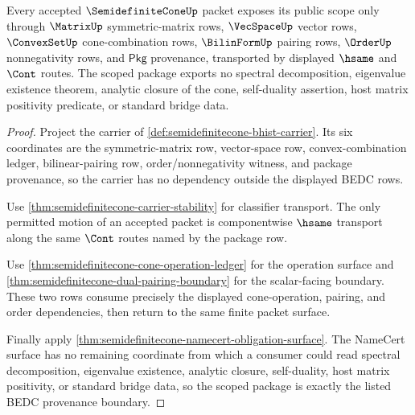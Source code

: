 \begin{theorem}
\label{thm:semidefinitecone-scoped-provenance-package}
Every accepted $\SemidefiniteConeUp$ packet exposes its public scope only
through $\MatrixUp$ symmetric-matrix rows, $\VecSpaceUp$ vector rows,
$\ConvexSetUp$ cone-combination rows, $\BilinFormUp$ pairing rows, $\OrderUp$
nonnegativity rows, and $\mathsf{Pkg}$ provenance, transported by displayed
$\hsame$ and $\Cont$ routes. The scoped package exports no spectral
decomposition, eigenvalue existence theorem, analytic closure of the cone,
self-duality assertion, host matrix positivity predicate, or standard bridge
data.
\end{theorem}
\begin{proof}
Project the carrier of \autoref{def:semidefinitecone-bhist-carrier}. Its six
coordinates are the symmetric-matrix row, vector-space row, convex-combination
ledger, bilinear-pairing row, order/nonnegativity witness, and package
provenance, so the carrier has no dependency outside the displayed BEDC rows.

Use \autoref{thm:semidefinitecone-carrier-stability} for classifier transport.
The only permitted motion of an accepted packet is componentwise $\hsame$
transport along the same $\Cont$ routes named by the package row.

Use \autoref{thm:semidefinitecone-cone-operation-ledger} for the operation
surface and \autoref{thm:semidefinitecone-dual-pairing-boundary} for the
scalar-facing boundary. These two rows consume precisely the displayed
cone-operation, pairing, and order dependencies, then return to the same finite
packet surface.

Finally apply \autoref{thm:semidefinitecone-namecert-obligation-surface}. The
NameCert surface has no remaining coordinate from which a consumer could read
spectral decomposition, eigenvalue existence, analytic closure, self-duality,
host matrix positivity, or standard bridge data, so the scoped package is
exactly the listed BEDC provenance boundary.
\end{proof}

